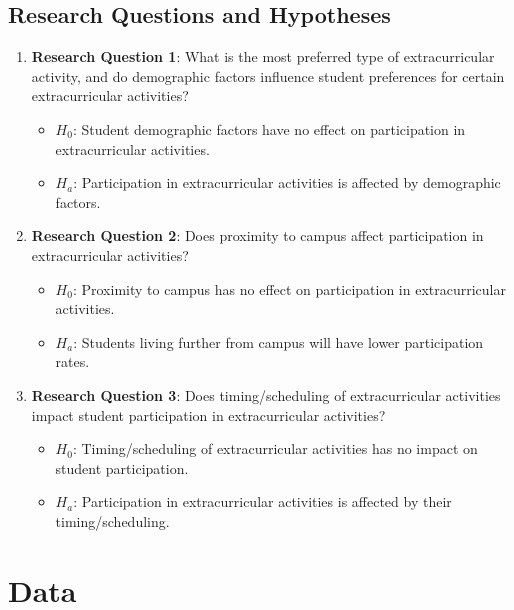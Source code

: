 \documentclass[
  letterpaper,
  DIV=11,
  numbers=noendperiod]{scrartcl}
\providecommand{\tightlist}{%
  \setlength{\itemsep}{0pt}\setlength{\parskip}{0pt}}\usepackage{longtable,booktabs,array}
\begin{document}
\subsection{Research Questions and
Hypotheses}\label{research-questions-and-hypotheses}

\begin{enumerate}
\def\labelenumi{\arabic{enumi}.}
\tightlist
\item
  \textbf{Research Question 1}: What is the most preferred type of
  extracurricular activity, and do demographic factors influence student
  preferences for certain extracurricular activities?

  \begin{itemize}
  \tightlist
  \item
    \textbf{\(H_{0}\)}: Student demographic factors have no effect on
    participation in extracurricular activities.
  \item
    \textbf{\(H_{a}\)}: Participation in extracurricular activities is
    affected by demographic factors.
  \end{itemize}
\item
  \textbf{Research Question 2}: Does proximity to campus affect
  participation in extracurricular activities?

  \begin{itemize}
  \tightlist
  \item
    \textbf{\(H_{0}\)}: Proximity to campus has no effect on
    participation in extracurricular activities.
  \item
    \textbf{\(H_{a}\)}: Students living further from campus will have
    lower participation rates.
  \end{itemize}
\item
  \textbf{Research Question 3}: Does timing/scheduling of
  extracurricular activities impact student participation in
  extracurricular activities?

  \begin{itemize}
  \tightlist
  \item
    \textbf{\(H_{0}\)}: Timing/scheduling of extracurricular activities
    has no impact on student participation.
  \item
    \textbf{\(H_{a}\)}: Participation in extracurricular activities is
    affected by their timing/scheduling.
  \end{itemize}
\end{enumerate}

\section{Data}\label{sec-data}
\end{document}
